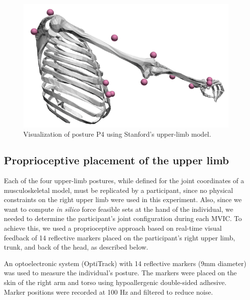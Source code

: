 \begin{figure}[!htb]
\begin{minipage}{0.3\linewidth}
        \includegraphics[trim={0 0 0 0}, clip, width=0.9\linewidth]{img/chapter_5/posture4_sagittal.png}
    \end{minipage}
    \caption{Visualization of posture P4 using Stanford's upper-limb model.}
    \label{fig:exp_pose4}
\end{figure}

\subsection{Proprioceptive placement of the upper limb}

Each of the four upper-limb postures, while defined for the joint coordinates of a musculoskeletal model, must be replicated by a participant, since no physical constraints on the right upper limb were used in this experiment. Also, since we want to compute \emph{in silico} force feasible sets at the hand of the individual, we needed to determine the participant's joint configuration during each MVIC. To achieve this, we used a proprioceptive approach based on real-time visual feedback of 14 reflective markers placed on the participant's right upper limb, trunk, and back of the head, as described below.

An optoelectronic system (OptiTrack) with 14 reflective markers (9mm diameter) was used to measure the individual's posture. The markers were placed on the skin of the right arm and torso using hypoallergenic double-sided adhesive. Marker positions were recorded at 100 Hz and filtered to reduce noise.

